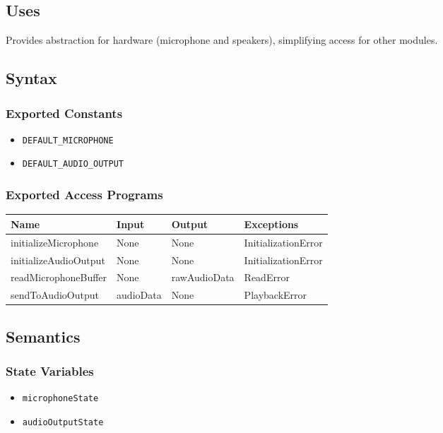 \documentclass[12pt, titlepage]{article}
\begin{document}
\subsection{Uses}  
Provides abstraction for hardware (microphone and speakers), simplifying access for other modules.  

\subsection{Syntax}  

\subsubsection{Exported Constants}  
\begin{itemize}
    \item \texttt{DEFAULT\_MICROPHONE}  
    \item \texttt{DEFAULT\_AUDIO\_OUTPUT}  
\end{itemize}  

\subsubsection{Exported Access Programs}  
\begin{center}  
\begin{tabular}{|p{5cm}|p{2cm}|p{4cm}|p{3cm}|}  
\hline  
\textbf{Name} & \textbf{Input} & \textbf{Output} & \textbf{Exceptions} \\  
\hline  
initializeMicrophone & None & None & InitializationError \\  
initializeAudioOutput & None & None & InitializationError \\  
readMicrophoneBuffer & None & rawAudioData & ReadError \\  
sendToAudioOutput & audioData & None & PlaybackError \\  
\hline  
\end{tabular}  
\end{center}  

\subsection{Semantics}  

\subsubsection{State Variables}  
\begin{itemize}  
    \item \texttt{microphoneState}  
    \item \texttt{audioOutputState}  
\end{itemize}  
\end{document}
